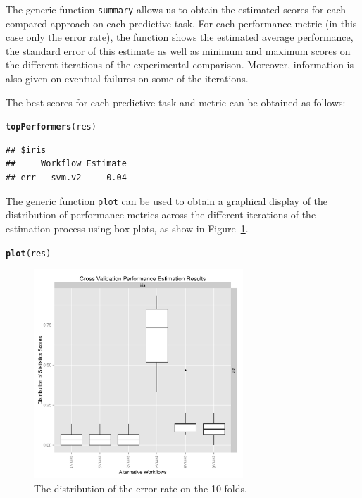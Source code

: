 \documentclass[10pt,a4paper]{article}\usepackage[]{graphicx}\usepackage[]{color}
\makeatletter
\newcommand{\hlstd}[1]{\textcolor[rgb]{0.345,0.345,0.345}{#1}}%
\newcommand{\hlkwd}[1]{\textcolor[rgb]{0.737,0.353,0.396}{\textbf{#1}}}%
\newenvironment{kframe}{%
 \def\at@end@of@kframe{}%
 \ifinner\ifhmode%
  \def\at@end@of@kframe{\end{minipage}}%
  \begin{minipage}{\columnwidth}%
 \fi\fi%
 \def\FrameCommand##1{\hskip\@totalleftmargin \hskip-\fboxsep
 \colorbox{shadecolor}{##1}\hskip-\fboxsep
     \hskip-\linewidth \hskip-\@totalleftmargin \hskip\columnwidth}%
 \MakeFramed {\advance\hsize-\width
   \@totalleftmargin\z@ \linewidth\hsize
   \@setminipage}}%
 {\par\unskip\endMakeFramed%
 \at@end@of@kframe}
\newenvironment{knitrout}{}{} %
\makeatother
\begin{document}
The generic function \texttt{summary} allows us to obtain the
estimated scores for each compared approach on each predictive
task. For each performance metric (in this case only the error rate),
the function shows the estimated average performance, the standard
error of this estimate as well as minimum and maximum scores on the
different iterations of the experimental comparison. Moreover,
information is also given on eventual failures on some of the
iterations.

The best scores for each predictive task and metric can be obtained as follows:

\begin{knitrout}
\color{fgcolor}\begin{kframe}
\begin{alltt}
\hlkwd{topPerformers}\hlstd{(res)}
\end{alltt}
\begin{verbatim}
## $iris
##     Workflow Estimate
## err   svm.v2     0.04
\end{verbatim}
\end{kframe}
\end{knitrout}


The generic function \texttt{plot} can be used to obtain a graphical
display of the distribution of performance metrics across the
different iterations of the estimation process using box-plots, as
show in Figure~\ref{fig:ex1Iris}. 

\begin{knitrout}
\color{fgcolor}\begin{kframe}
\begin{alltt}
\hlkwd{plot}\hlstd{(res)}
\end{alltt}
\end{kframe}\begin{figure}[]


{\centering \includegraphics[width=0.7\textwidth]{figures/perfEst-ex1Iris} 

}

\caption[The distribution of the error rate on the 10 folds]{The distribution of the error rate on the 10 folds.\label{fig:ex1Iris}}
\end{figure}


\end{knitrout}
\end{document}
